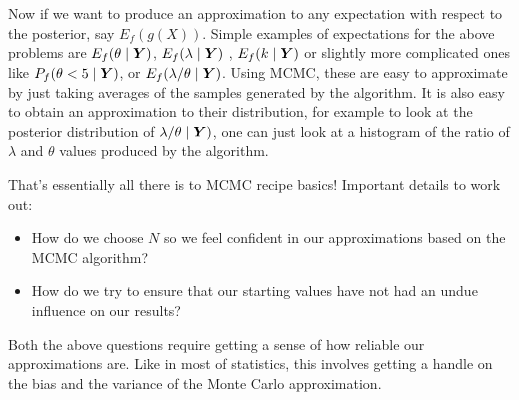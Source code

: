 \documentclass[11pt]{article}
\newcommand{\bY}{ \mbox{\boldmath $Y$}}
\begin{document}
Now if we want to produce an approximation to any expectation with
respect to the posterior, say $E_f(g(X))$. Simple examples of
expectations for the above problems are $E_f(\theta \mid \bY)$,
$E_f(\lambda \mid \bY)$ , $E_f(k \mid \bY)$ or slightly more complicated
ones like $P_f(\theta <5\mid \bY)$, or $E_f(\lambda/\theta \mid 
\bY)$. Using MCMC, these are easy to approximate by just taking
averages of the samples generated by the algorithm. It is also easy to
obtain an approximation to their distribution, for example to look at
the posterior distribution of $\lambda/\theta \mid \bY)$, one can just
look at a histogram of the ratio of $\lambda$ and $\theta$ values
produced by the algorithm. 

That's essentially all there is to MCMC recipe basics! Important details to work out:
\begin{itemize}
\item How do we choose $N$ so we feel confident in our approximations
  based on the MCMC algorithm?
  \item How do we try to ensure that our starting values have not had
    an undue influence on our results? 
  \end{itemize}
  Both the above questions require getting a sense of how reliable our
  approximations are. Like in most of statistics, this involves getting
  a handle on the bias and the variance of the Monte Carlo
  approximation. 
\end{document}
